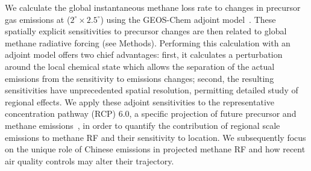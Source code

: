 
 We calculate the global instantaneous methane loss rate to changes in precursor gas emissions at ($2^{\circ}\times 2.5^{\circ}$)  using the GEOS-Chem adjoint model~\citep{ref:henze2007}. These spatially explicit sensitivities to precursor changes are then related to global methane radiative forcing (see Methods). Performing this calculation with an adjoint model offers two chief advantages: first, it calculates a perturbation around the local chemical state which allows the separation of the actual emissions from the sensitivity  to emissions changes; second, the resulting sensitivities have unprecedented spatial resolution, permitting detailed study of regional effects. We apply these adjoint sensitivities to the representative concentration pathway (RCP) 6.0, a specific projection of future precursor and methane emissions~\citep{ref:vanvuuren2011}, in order to quantify the contribution of regional scale emissions to methane RF and their sensitivity to location. We subsequently focus on the unique role of Chinese emissions in projected methane RF and how recent air quality controls may alter their trajectory.
